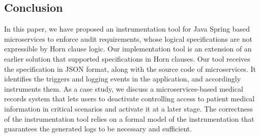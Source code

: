 \subsection{Conclusion} \label{sec:conclusion}
In this paper, we have proposed an instrumentation tool for Java Spring based microservices to enforce audit requirements, whose logical specifications are not expressible by Horn clause logic. Our implementation tool is an extension of an earlier solution that supported specifications in Horn clauses. Our tool receives the specification in JSON format, along with the source code of microservices. It identifies the triggers and logging events in the application, and accordingly instruments them. As a case study, we discuss a microservices-based medical records system that lets users to deactivate controlling access to patient medical information in critical scenarios and activate it at a later stage. The correctness of the instrumentation tool relies on a formal model of the instrumentation that guarantees the generated logs to be necessary and sufficient.



